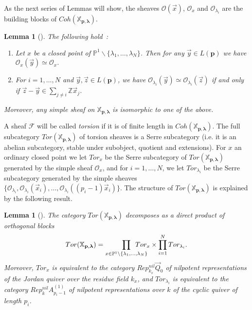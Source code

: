 \documentclass[a4paper,10pt]{amsart}
\def\Z{\mathbb{Z}}
\def\O{\mathcal{O}}
\def\p{\mathbf{p}}
\def\xpl{\mathbb{X}_{\mathbf{p},\boldsymbol{\lambda}}}
\newtheorem{lem}[theo]{Lemma}
\numberwithin{equation}{section}
\begin{document}
{\vspace{.15in}

As the next series of Lemmas will show, the sheaves $\O(\vec{x})$, $\O_x$ and $\O_{\lambda_i}$ are the building blocks of $Coh(\xpl)$.

\vspace{.1in}

\begin{lem}[\cite{GL}]The following hold~:
\begin{enumerate}
\item[i)] Let $x$ be a closed point of $\mathbb{P}^1\backslash \{\lambda_1, \ldots, \lambda_N\}$. Then for any $\vec{y} \in L(\p)$ we have $\O_x(\vec{y})\simeq \O_x$. \\
\item[ii)] For $i=1, \ldots, N$ and $\vec{y},\vec{z} \in L(\p)$, we have $\O_{\lambda_i}(\vec{y}) \simeq \O_{\lambda_i}(\vec{z})$ if and only if $\vec{z}-\vec{y} \in \sum_{j \neq i} \Z \vec{x}_j$.
\end{enumerate}
Moreover, any simple sheaf on $\xpl$ is isomorphic to one of the above.
\end{lem}

\vspace{.15in}

A sheaf $\mathcal{F}$ will be called \textit{torsion} if it is of finite length in $Coh(\xpl)$. The full subcategory $Tor(\xpl)$ of torsion sheaves is a Serre subcategory (i.e. it is an abelian subcategory, stable under subobject, quotient and extensions). For $x$ an ordinary closed point we let $Tor_x$ be the Serre subcategory of $Tor(\xpl)$ generated by the simple sheaf $\O_x$, and for $i=1, \ldots, N$, we let $Tor_{\lambda_i}$ be the Serre subcategory generated by the simple sheaves $\{\O_{\lambda_i}, \O_{\lambda_i}(\vec{x}_i), \ldots, \O_{\lambda_i}((p_i-1)\vec{x}_i)\}$. The structure of $Tor(\xpl)$ is explained by the following result.

\vspace{.1in}

\begin{lem}[\cite{GL}]\label{L:classtorxpl} The category $Tor(\xpl)$ decomposes as a direct product of orthogonal blocks
$$Tor(\xpl)=\prod_{x \in \mathbb{P}^1\backslash\{\lambda_1, \ldots, \lambda_N\}} \hspace{-.27in}Tor_x \times \prod_{i=1}^N Tor_{\lambda_i}.$$
Moreover, $Tor_x$ is equivalent to the category $Rep^{nil}_{k_x}\vec{Q}_0$ of nilpotent representations of the Jordan quiver over the residue field $k_x$, and $Tor_{\lambda_i}$ is equivalent to the category $Rep^{nil}_kA_{p_i-1}^{(1)}$ of nilpotent representations over $k$ of the cyclic quiver of length $p_i$.
\end{lem}

}
\end{document}
